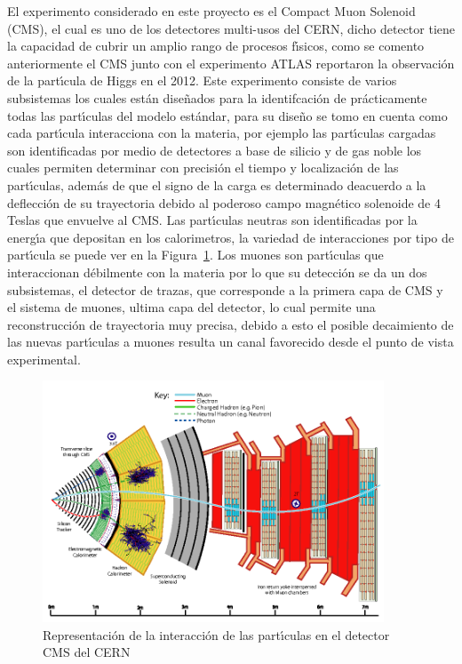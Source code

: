 El experimento considerado en este proyecto es el Compact Muon Solenoid (CMS), el cual es uno de los detectores multi-usos del CERN, dicho detector tiene la capacidad de cubrir un amplio rango de procesos f\'{\i}sicos, como se comento anteriormente el CMS junto con el experimento ATLAS reportaron la observaci\'on de la part\'{\i}cula de Higgs en el 2012.  Este experimento consiste de varios subsistemas los cuales est\'an dise\~nados para la identifcaci\'on de pr\'acticamente todas las part\'{\i}culas del modelo est\'andar, para su dise\~no se tomo en cuenta como cada part\'{\i}cula interacciona con la materia, por ejemplo las part\'{\i}culas cargadas son identificadas por medio de detectores a base de silicio y de gas noble los cuales permiten determinar con precisi\'on el tiempo y localizaci\'on de las part\'{\i}culas, adem\'as de que el signo de la carga es determinado deacuerdo a la deflecci\'on de su trayectoria debido al poderoso campo magn\'etico solenoide de 4 Teslas que envuelve al CMS.  Las part\'{\i}culas neutras son identificadas por la energ\'{\i}a que depositan en los calorimetros, la variedad de interacciones por tipo de part\'{\i}cula se puede ver en la Figura~\ref{fig:cms_interaction}. Los muones son part\'{\i}culas que interaccionan d\'ebilmente con la materia por lo que su detecci\'on se da un dos subsistemas, el detector de trazas, que corresponde a la primera capa de CMS y el sistema de muones, ultima capa del detector, lo cual permite una reconstrucci\'on de trayectoria muy precisa, debido a esto el posible decaimiento de las nuevas part\'{\i}culas a muones resulta un canal favorecido desde el punto de vista experimental.


\begin{figure}
\begin{center}
 \includegraphics[width=4.0in]{cms_interaction.png}
  \caption{Representaci\'on de la interacci\'on de las part\'{\i}culas en el detector CMS del CERN}
 \label{fig:cms_interaction}
 \end{center}
\end{figure}

